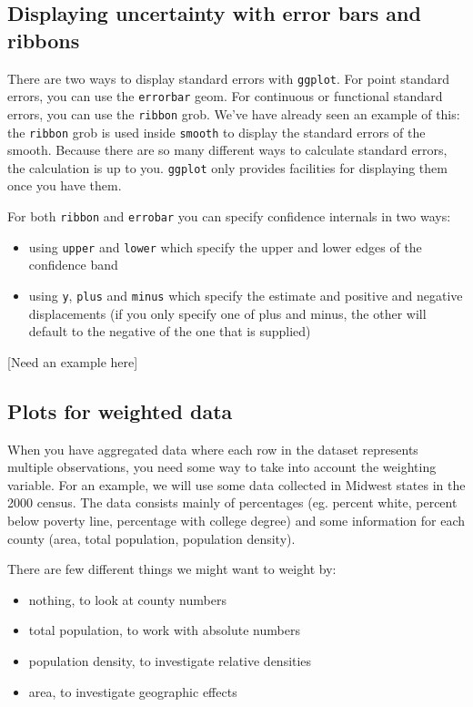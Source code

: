 \subsection{Displaying uncertainty with error bars and ribbons}\label{sub:error_bars}

There are two ways to display standard errors with {\tt ggplot}.  For point standard errors, you can use the {\tt errorbar} geom.  For continuous or functional standard errors, you can use the {\tt ribbon} grob.  We've have already seen an example of this: the {\tt ribbon} grob is used inside {\tt smooth} to display the standard errors of the smooth.  Because there are so many different ways to calculate standard errors, the calculation is up to you.  {\tt ggplot} only provides facilities for displaying them once you have them.

For both {\tt ribbon} and {\tt errobar} you can specify confidence internals in two ways:

\begin{itemize}
	\item using {\tt upper} and {\tt lower} which specify the upper and lower edges of the confidence band

	\item using {\tt y}, {\tt plus} and {\tt minus} which specify the estimate and positive and negative displacements (if you only specify one of plus and minus, the other will default to the negative of the one that is supplied)
\end{itemize}

[Need an example here]

\subsection{Plots for weighted data}\label{sec:weighted_data}

When you have aggregated data where each row in the dataset represents multiple observations, you need some way to take into account the weighting variable.  For an example, we will use some data collected in Midwest states in the 2000 census.  The data consists mainly of percentages (eg. percent white, percent below poverty line, percentage with college degree) and some information for each county (area, total population, population density).

There are few different things we might want to weight by: 

\begin{itemize}
	\item nothing, to look at county numbers
	\item total population, to work with absolute numbers
	\item population density, to investigate relative densities
	\item area, to investigate geographic effects
\end{itemize}

